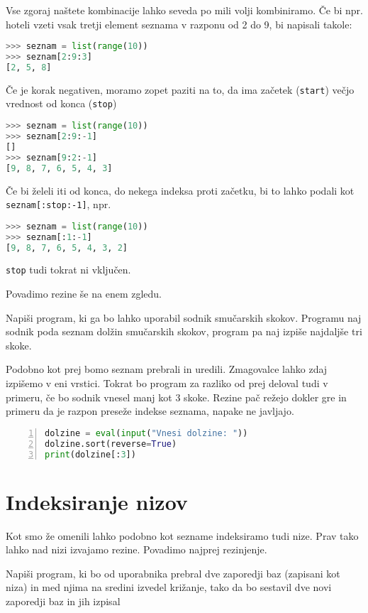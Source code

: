 Vse zgoraj naštete kombinacije lahko seveda po mili volji kombiniramo. Če bi npr. hoteli vzeti vsak tretji element seznama v razponu od 2 do 9, bi napisali takole:
\begin{lstlisting}[language=Python, showstringspaces=false]
>>> seznam = list(range(10))
>>> seznam[2:9:3]
[2, 5, 8]
\end{lstlisting}
Če je korak negativen, moramo zopet paziti na to, da ima začetek (\texttt{start}) večjo vrednost od konca (\texttt{stop})
\begin{lstlisting}[language=Python, showstringspaces=false]
>>> seznam = list(range(10))
>>> seznam[2:9:-1]
[]
>>> seznam[9:2:-1]
[9, 8, 7, 6, 5, 4, 3]
\end{lstlisting}
Če bi želeli iti od konca, do nekega indeksa proti začetku, bi to lahko podali kot \texttt{seznam[:stop:-1]}, npr.
\begin{lstlisting}[language=Python, showstringspaces=false]
>>> seznam = list(range(10))
>>> seznam[:1:-1]
[9, 8, 7, 6, 5, 4, 3, 2]
\end{lstlisting}
\texttt{stop} tudi tokrat ni vključen.

Povadimo rezine še na enem zgledu.
\begin{zgled}
Napiši program, ki ga bo lahko uporabil sodnik smučarskih skokov. Programu naj sodnik poda seznam dolžin smučarskih skokov, program pa naj izpiše najdaljše tri skoke.
\end{zgled}

\begin{resitev}
Podobno kot prej bomo seznam prebrali in uredili. Zmagovalce lahko zdaj izpišemo v eni vrstici. Tokrat bo program za razliko od prej deloval tudi v primeru, če bo sodnik vnesel manj kot 3 skoke. Rezine pač režejo dokler gre in primeru da je razpon preseže indekse seznama, napake ne javljajo.
\begin{lstlisting}[language=Python, showstringspaces=false,numbers=left]
dolzine = eval(input("Vnesi dolzine: "))
dolzine.sort(reverse=True)
print(dolzine[:3])
\end{lstlisting}
\end{resitev}

\section{Indeksiranje nizov}
Kot smo že omenili lahko podobno kot sezname indeksiramo tudi nize. Prav tako lahko nad nizi izvajamo rezine. Povadimo najprej rezinjenje.

\begin{zgled}
Napiši program, ki bo od uporabnika prebral dve zaporedji baz (zapisani kot niza) in med njima na sredini izvedel križanje, tako da bo sestavil dve novi zaporedji baz in jih izpisal
\end{zgled}

